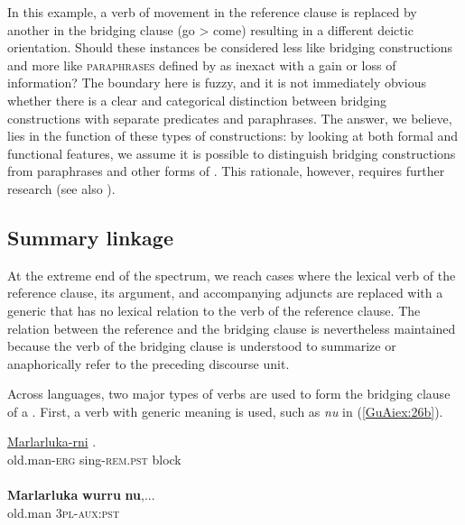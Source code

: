 \documentclass[output=paper]{LSP/langsci}
\begin{document}
\noindent
In this example, a verb of movement in the reference clause is replaced by another in the bridging clause (go > come) resulting in a different deictic orientation. Should these instances be considered less like bridging constructions and more like \textsc{paraphrases} defined by \citet[][382--383]{longacre07} as inexact  with a gain or loss of information? The boundary here is fuzzy, and it is not immediately obvious whether there is a clear and categorical distinction between bridging constructions with separate predicates and paraphrases. The answer, we believe, lies in the function of these types of constructions: by looking at both formal and functional features, we assume it is possible to distinguish bridging constructions from paraphrases and other forms of . This rationale, however, requires further research (see also ).

\subsection{Summary linkage}
\label{GuAi32summ.link}
At the extreme end of the  spectrum, we reach cases where the lexical verb of the reference clause, its argument, and accompanying adjuncts are replaced with a generic  that has no lexical relation to the verb of the reference clause. The relation between the reference and the bridging clause is nevertheless maintained because the verb of the bridging clause is understood to summarize or anaphorically refer to the preceding discourse unit.

Across languages, two major types of verbs are used to form the bridging clause of a . First, a verb with generic meaning is used, such as \textit{nu} in (\ref{GuAiex:26b}).

\begin{exe}
\ex \label{GuAiex:26ab}
 {\citealt{Pensalfini}}
\begin{xlist}
\ex \label{GuAiex:26a}
\gll \underline{Marlarluka-rni}    \underline{}  \underline{}. \\
old.man-\textsc{erg}     sing-\textsc{rem.pst}    block\\
\glt {} \\
\ex \label{GuAiex:26b}
\gll  \textbf{Marlarluka}   \textbf{wurru} \textbf{nu},...\\
 old.man   \textsc{3pl}-\textsc{aux:pst}\\
\glt {} 
\end{xlist}
\end{exe}
\end{document}
